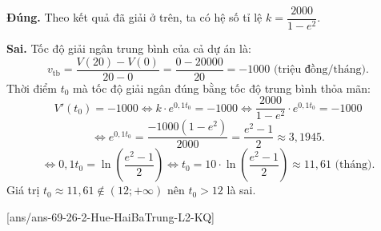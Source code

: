 \begin{ex}
{\begin{itemchoice}
			\itemch \textbf{Đúng.} Theo kết quả đã giải ở trên, ta có hệ số tỉ lệ $k = \dfrac{2000}{1-e^2}$.
			
			\itemch \textbf{Sai.} Tốc độ giải ngân trung bình của cả dự án là:
			\[ v_{\text{tb}} = \dfrac{V(20) - V(0)}{20 - 0} = \dfrac{0 - 20000}{20} = -1000 \text{ (triệu đồng/tháng)}. \]
			Thời điểm $t_0$ mà tốc độ giải ngân đúng bằng tốc độ trung bình thỏa mãn:
			\[ V'(t_0) = -1000 \Leftrightarrow k \cdot e^{0,1t_0} = -1000 \Leftrightarrow \dfrac{2000}{1-e^2} \cdot e^{0,1t_0} = -1000 \]
			\[ \Leftrightarrow e^{0,1t_0} = \dfrac{-1000(1-e^2)}{2000} = \dfrac{e^2 - 1}{2} \approx 3,1945. \]
			\[ \Leftrightarrow 0,1t_0 = \ln\left(\dfrac{e^2 - 1}{2}\right) \Leftrightarrow t_0 = 10 \cdot \ln\left(\dfrac{e^2 - 1}{2}\right) \approx 11,61 \text{ (tháng)}. \]
			Giá trị $t_0 \approx 11,61 \notin (12; +\infty)$ nên $t_0 > 12$ là sai.
		\end{itemchoice}
	}
\end{ex}
\caukq
{}[ans/ans-69-26-2-Hue-HaiBaTrung-L2-KQ]
